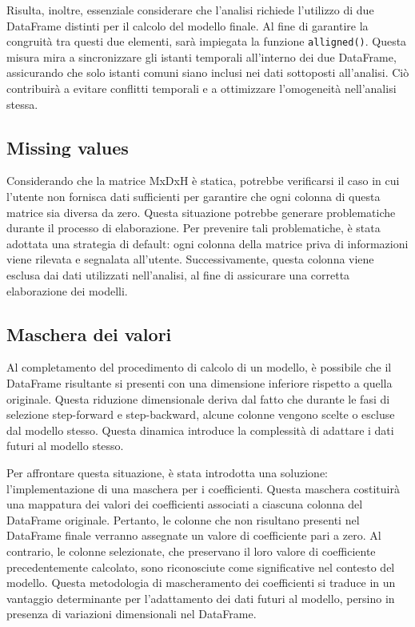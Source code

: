 \documentclass[a4paper,10pt]{article}
\begin{document}
Risulta, inoltre, essenziale considerare che l'analisi richiede l'utilizzo di due DataFrame distinti per il calcolo del modello finale. 
Al fine di garantire la congruità tra questi due elementi, sarà impiegata la funzione \texttt{alligned()}. Questa misura mira a sincronizzare 
gli istanti temporali all'interno dei due DataFrame, assicurando che solo istanti comuni siano inclusi nei dati sottoposti all'analisi. 
Ciò contribuirà a evitare conflitti temporali e a ottimizzare l'omogeneità nell'analisi stessa.

\subsection{Missing values}

Considerando che la matrice MxDxH è statica, potrebbe verificarsi il caso in cui l'utente non fornisca dati sufficienti per garantire che ogni 
colonna di questa matrice sia diversa da zero. Questa situazione potrebbe generare problematiche durante il processo di elaborazione. 
Per prevenire tali problematiche, è stata adottata una strategia di default: ogni colonna della matrice priva di informazioni viene rilevata e segnalata 
all'utente. Successivamente, questa colonna viene esclusa dai dati utilizzati nell'analisi, al fine di assicurare una corretta elaborazione dei modelli.

\subsection{Maschera dei valori}

Al completamento del procedimento di calcolo di un modello, è possibile che il DataFrame risultante si presenti con una dimensione inferiore rispetto
a quella originale. Questa riduzione dimensionale deriva dal fatto che durante le fasi di selezione step-forward e step-backward, alcune colonne vengono 
scelte o escluse dal modello stesso. Questa dinamica introduce la complessità di adattare i dati futuri al modello stesso.

Per affrontare questa situazione, è stata introdotta una soluzione: l'implementazione di una maschera per i coefficienti. 
Questa maschera costituirà una mappatura dei valori dei coefficienti associati a ciascuna colonna del DataFrame originale. 
Pertanto, le colonne che non risultano presenti nel DataFrame finale verranno assegnate un valore di coefficiente pari a zero. Al contrario, le colonne 
selezionate, che preservano il loro valore di coefficiente precedentemente calcolato, sono riconosciute come significative nel contesto del modello. 
Questa metodologia di mascheramento dei coefficienti si traduce in un vantaggio determinante per l'adattamento dei dati futuri al modello, 
persino in presenza di variazioni dimensionali nel DataFrame.
\end{document}
